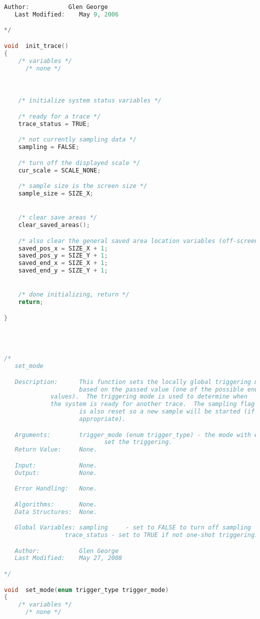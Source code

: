\begin{lstlisting}[language=C]
   Author:           Glen George
   Last Modified:    May 9, 2006

*/

void  init_trace()
{
    /* variables */
      /* none */



    /* initialize system status variables */

    /* ready for a trace */
    trace_status = TRUE;

    /* not currently sampling data */
    sampling = FALSE;

    /* turn off the displayed scale */
    cur_scale = SCALE_NONE;

    /* sample size is the screen size */
    sample_size = SIZE_X;


    /* clear save areas */
    clear_saved_areas();

    /* also clear the general saved area location variables (off-screen) */
    saved_pos_x = SIZE_X + 1;
    saved_pos_y = SIZE_Y + 1;
    saved_end_x = SIZE_X + 1;
    saved_end_y = SIZE_Y + 1;


    /* done initializing, return */
    return;

}




/*
   set_mode

   Description:      This function sets the locally global triggering mode
                     based on the passed value (one of the possible enumerated
		     values).  The triggering mode is used to determine when
		     the system is ready for another trace.  The sampling flag
                     is also reset so a new sample will be started (if that is
                     appropriate).

   Arguments:        trigger_mode (enum trigger_type) - the mode with which to
   							set the triggering.
   Return Value:     None.

   Input:            None.
   Output:           None.

   Error Handling:   None.

   Algorithms:       None.
   Data Structures:  None.

   Global Variables: sampling     - set to FALSE to turn off sampling
	             trace_status - set to TRUE if not one-shot triggering.

   Author:           Glen George
   Last Modified:    May 27, 2008

*/

void  set_mode(enum trigger_type trigger_mode)
{
    /* variables */
      /* none */




\end{lstlisting}
